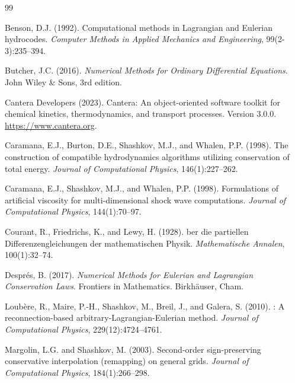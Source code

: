 \documentclass[12pt,a4paper]{article}
\begin{document}

\begin{thebibliography}{99}

Benson, D.J. (1992).
\newblock Computational methods in {L}agrangian and {E}ulerian hydrocodes.
\newblock \emph{Computer Methods in Applied Mechanics and Engineering}, 99(2-3):235--394.

Butcher, J.C. (2016).
\newblock \emph{Numerical Methods for Ordinary Differential Equations}.
\newblock John Wiley \& Sons, 3rd edition.

Cantera Developers (2023).
\newblock Cantera: An object-oriented software toolkit for chemical kinetics, thermodynamics, and transport processes.
\newblock Version 3.0.0. \url{https://www.cantera.org}.

Caramana, E.J., Burton, D.E., Shashkov, M.J., and Whalen, P.P. (1998{}).
\newblock The construction of compatible hydrodynamics algorithms utilizing conservation of total energy.
\newblock \emph{Journal of Computational Physics}, 146(1):227--262.

Caramana, E.J., Shashkov, M.J., and Whalen, P.P. (1998{}).
\newblock Formulations of artificial viscosity for multi-dimensional shock wave computations.
\newblock \emph{Journal of Computational Physics}, 144(1):70--97.

Courant, R., Friedrichs, K., and Lewy, H. (1928).
ber die partiellen {D}ifferenzengleichungen der mathematischen {P}hysik.
\newblock \emph{Mathematische Annalen}, 100(1):32--74.

Despr{\'e}s, B. (2017).
\newblock \emph{Numerical Methods for {E}ulerian and {L}agrangian Conservation Laws}.
\newblock Frontiers in Mathematics. Birkh{\"a}user, Cham.

Loub{\`e}re, R., Maire, P.-H., Shashkov, M., Breil, J., and Galera, S. (2010).
: A reconnection-based arbitrary-{L}agrangian-{E}ulerian method.
\newblock \emph{Journal of Computational Physics}, 229(12):4724--4761.

Margolin, L.G. and Shashkov, M. (2003).
\newblock Second-order sign-preserving conservative interpolation (remapping) on general grids.
\newblock \emph{Journal of Computational Physics}, 184(1):266--298.


\end{thebibliography}
\end{document}
